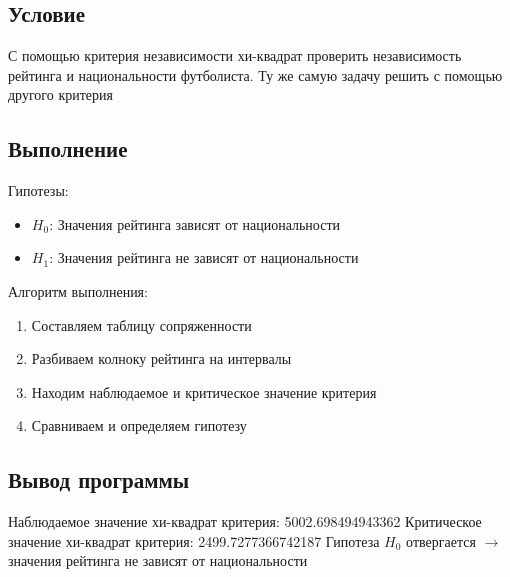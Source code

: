 \documentclass{article}
\begin{document}
\subsection{Условие}
С помощью критерия независимости хи-квадрат проверить независимость рейтинга и национальности футболиста. Ту же самую задачу решить с помощью другого критерия
\subsection{Выполнение}
Гипотезы:
\begin{itemize}
      \item $H_0$: Значения рейтинга зависят от национальности
      \item $H_1$: Значения рейтинга не зависят от национальности
\end{itemize}
Алгоритм выполнения:
\begin{enumerate}
      \item Составляем таблицу сопряженности
      \item Разбиваем колноку рейтинга на интервалы
      \item Находим наблюдаемое и критическое значение критерия
      \item Сравниваем и определяем гипотезу
\end{enumerate}
\subsection{Вывод программы}
Наблюдаемое значение хи-квадрат критерия: 5002.698494943362
Критическое значение хи-квадрат критерия: 2499.7277366742187
Гипотеза $H_0$ отвергается $\rightarrow$ значения рейтинга не зависят от национальности
\end{document}
